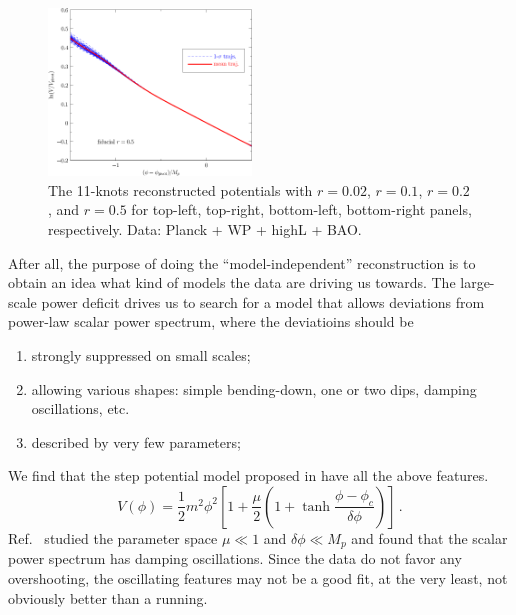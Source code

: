 \documentclass[11pt]{article}
\def \halffigwidth{0.48\textwidth}
\begin{document}
\begin{figure}
  \includegraphics[width=\halffigwidth]{nobicep_spline0_p11_r0d5_potential_traj.pdf}
  \caption{The 11-knots reconstructed potentials with $r = 0.02$, $r=0.1$, $r=0.2$, and $r=0.5$ for top-left, top-right, bottom-left, bottom-right panels, respectively.  Data: Planck + WP + highL + BAO. \label{fig:traj_potential}}
\end{figure}

After all, the purpose of doing the ``model-independent'' reconstruction is to obtain an idea what kind of models the data are driving us towards. The large-scale power deficit drives us to search for a model that allows deviations from power-law scalar power spectrum, where the deviatioins should be
\begin{enumerate}
\item{strongly suppressed on small scales;}
\item{allowing various shapes: simple bending-down, one or two dips, damping oscillations, etc.}
\item{described by very few parameters;}
\end{enumerate}

We find that the step potential model proposed in \cite{Adams2001} have all the above features.
\begin{equation}
V(\phi) = \frac{1}{2}m^2\phi^2\left[1 + \frac{\mu}{2} (1 + \tanh{\frac{\phi - \phi_c}{\delta\phi}}) \right] \,. \label{eq:pot}
\end{equation}
Ref.~\cite{Adams2001} studied the parameter space $\mu \ll 1$ and $\delta\phi \ll M_p$ and found that the scalar power spectrum has damping oscillations. Since the data do not favor any overshooting, the oscillating features may not be a good fit,  at the very least, not obviously better than a running. 
\end{document}
